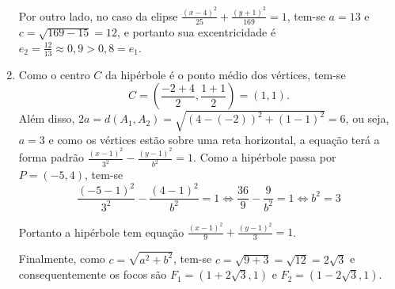 \documentclass[12pt,a4paper]{article}
\begin{document}
\begin{enumerate}
Por outro lado, no caso da elipse $\frac{(x-4)^2}{25} + \frac{(y+1)^2}{169} = 1$, tem-se $a = 13$ e $c=\sqrt{169-15} = 12$, e portanto sua excentricidade é $e_2 = \frac{12}{13} \approx 0,9 > 0,8 = e_1$.

\item Como o centro $C$ da hipérbole é o ponto médio dos vértices, tem-se
\[
C = \left(\frac{-2+4}{2},\frac{1+1}{2}\right) = (1,1).
\]
Além disso, $2a = d(A_1,A_2) = \sqrt{(4-(-2))^2+(1-1)^2} = 6$, ou seja, $a = 3$ e como os vértices estão sobre uma reta horizontal, a equação terá a forma padrão $\frac{(x-1)^2}{3^2}-\frac{(y-1)^2}{b^2}=1$. Como a hipérbole passa por $P=(-5,4)$, tem-se
\[
\frac{(-5-1)^2}{3^2}-\frac{(4-1)^2}{b^2}=1
\Leftrightarrow
\frac{36}{9}-\frac{9}{b^2}=1
\Leftrightarrow
b^2=3
\]

Portanto a hipérbole tem equação $\frac{(x-1)^2}{9} + \frac{(y-1)^2}{3} = 1$.

Finalmente, como $c = \sqrt{a^2+b^2}$, tem-se $c = \sqrt{9+3} = \sqrt{12}= 2\sqrt{3}$ e consequentemente os focos são
$F_1 = (1+2\sqrt{3},1)$ e
$F_2 = (1-2\sqrt{3},1)$.



\end{enumerate}
\end{document}

